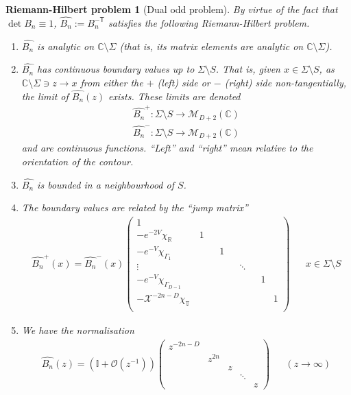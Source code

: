\documentclass[12pt]{article}
\newtheorem{rhp}[theorem]{Riemann-Hilbert problem}
\theoremstyle{definition}
\begin{document}
\begin{rhp}[Dual odd problem] By virtue of the fact that $\det B_n \equiv 1$, $\widehat{B_n}:=B_n^{-\mathsf{T}}$ satisfies the following Riemann-Hilbert problem.
\begin{enumerate}
\item $\widehat{B_{n}}$ is analytic on $\mathbb{C}\setminus \Sigma$ (that is, its matrix elements are analytic on $\mathbb{C}\setminus \Sigma$).
\item $\widehat{B_{n}}$ has continuous boundary values up to $\Sigma \setminus S$. That is,  given $x \in \Sigma \setminus S$,  as $\mathbb{C}\setminus \Sigma  \ni  z \to x$ from either the $+$ (left) side or $-$ (right) side non-tangentially,  the limit of $\widehat{B_{n}}(z)$ exists. These limits are denoted
\begin{align*}
\widehat{B_{n}}^+ : \Sigma \setminus S \to \mathcal{M}_{D+2}(\mathbb{C}) \\
\widehat{B_{n}}^- : \Sigma \setminus S \to  \mathcal{M}_{D+2}(\mathbb{C})
\end{align*}
and are continuous functions.  \enquote{Left} and \enquote{right} mean relative to the orientation of the contour. 
\item $\widehat{B_{n}}$ is bounded in a neighbourhood of $S$.
\item The boundary values are related by the \enquote{jump matrix}
\begin{align*}
\widehat{B_{n}}^{+}(x) = \widehat{B_{n}}^{-}(x)\left(
\begin{array}{ccccccccccccccccccc}
1 \,  & & &  \\
- e^{-2V} \chi_\mathbb{R}  & 1 \\
- e^{-V} \chi_{\Gamma_1}   & & & 1 \\
\vdots  & & & & &   \ddots \\
- e^{-V} \chi_{\Gamma_{D-1}}  \,  & & & & & &  &  1 \\
- \mathscr{X}^{-2n-D} \chi_{\mathbb{T}}  \,  & & & & & &  &  &  1 \\
\end{array} \right) & & x \in \Sigma \setminus S
\end{align*}
\item We have the normalisation
\begin{align*}
\widehat{B_{n}}(z) = \left(\mathbb{I}+ \mathcal{O}(z^{-1})\right) \left(\begin{matrix}
z^{-2n-D} \\
& z^{2n} \\
& & z \\
& & & \ddots  \\
& & & & z
\end{matrix} \right) & & (z \to \infty)
\end{align*}
\end{enumerate}
\end{rhp}
\end{document}
